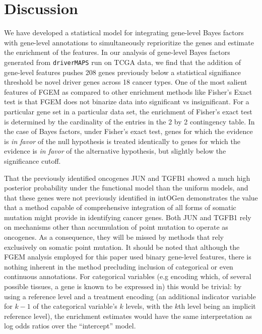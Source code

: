 \section{Discussion}\label{sec:org3165b14}

We have developed a statistical model for integrating gene-level Bayes factors with gene-level annotations to simultaneously reprioritize the genes and estimate the enrichment of the features. In our analysis of gene-level Bayes factors generated from \texttt{driverMAPS} run on TCGA data, we find that the addition of gene-level features pushes 208 genes previously below a statistical signifiance threshold be novel driver genes across 18 cancer types.
One of the most salient features of FGEM as compared to other enrichment methods like Fisher's Exact test is that FGEM does not binarize data into significant vs insignificant.  For a particular gene set in a particular data set, the enrichment of Fisher's exact test is determined by the cardinality of the entries in the 2 by 2 contingency table.  In the case of Bayes factors, under Fisher's exact test, genes for which the evidence is \emph{in favor} of the null hypothesis is treated identically to genes for which the evidence is \emph{in favor} of the alternative hypothesis, but slightly below the significance cutoff. 

That the previously identified oncogenes JUN and TGFB1 showed a much high posterior probability under the functional model than the uniform models, and that these genes were not previously identified in intOGen demonstrates the value that a method capable of comprehensive integration of all forms of somatic mutation might provide in identifying cancer genes.  Both JUN and TGFB1 rely on mechanisms other than accumulation of point mutation to operate as oncogenes.  As a consequence, they will be missed by methods that rely exclusively on somatic point mutation.
It should be noted that although the FGEM analysis employed for this paper used binary gene-level features, there is nothing inherent in the method precluding inclusion of categorical or even continuous annotations.  For categorical variables (e.g encoding which, of several possible tissues, a gene is known to be expressed in) this would be
trivial: by using a reference level\cite{chambers1992statistical} and a treatment encoding (an additional indicator variable for $k-1$ of the categorical variable's $k$ levels, with the $k$th level being an implicit reference level), the enrichment estimates would have the same interpretation as log odds ratios over the ``intercept'' model.

